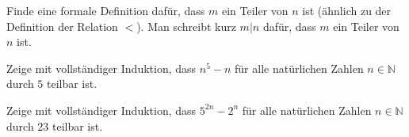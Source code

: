\documentclass{zusammenfassung}
\begin{document}
\begin{aufgabe}
	Finde eine formale Definition dafür, dass $m$ ein Teiler von $n$ ist (ähnlich zu der Definition der Relation $<$). Man schreibt 
	kurz $m|n$ dafür, dass $m$ ein Teiler von $n$ ist.
\end{aufgabe}

\begin{aufgabe}
	Zeige mit vollständiger Induktion, dass $n^5-n$ für alle natürlichen Zahlen $n\in\mathbb N$ durch $5$ teilbar ist.
\end{aufgabe}

\begin{aufgabe}
	Zeige mit vollständiger Induktion, dass $5^{2n}-2^n$ für alle natürlichen Zahlen $n\in\mathbb N$ durch $23$ teilbar ist.
\end{aufgabe}
\end{document}
